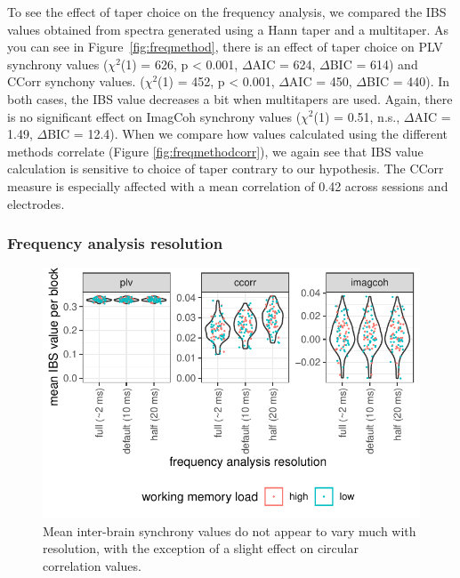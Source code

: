 To see the effect of taper choice on the frequency analysis, we compared the
IBS values obtained from spectra generated using a Hann taper and a multitaper.
As you can see in Figure~\ref{fig:freqmethod}, there is an effect of taper
choice on PLV synchrony values ($\chi^2$(1) = 626, p < 0.001, $\Delta$AIC = 624,
$\Delta$BIC = 614) and CCorr synchony values. ($\chi^2$(1) = 452, p < 0.001,
$\Delta$AIC = 450, $\Delta$BIC = 440). In both cases, the IBS value decreases a
bit when multitapers are used. Again, there is no significant effect on
ImagCoh synchrony values ($\chi^2$(1) = 0.51, n.s., $\Delta$AIC = 1.49,
$\Delta$BIC = 12.4). When we compare how values calculated using the different
methods correlate (Figure \ref{fig:freqmethodcorr}), we again see that IBS value
calculation is sensitive to choice of taper contrary to our hypothesis. The
CCorr measure is especially affected with a mean correlation of 0.42 across
sessions and electrodes.

\subsubsection{Frequency analysis resolution}

\begin{figure}[!htpb]
  \includegraphics[width=\linewidth]{../stats/results/resolution.pdf}
  \caption{Mean inter-brain synchrony values do not appear to vary much with resolution, with the exception of a slight effect on circular correlation values.}
  \label{fig:resolution}
\end{figure}

